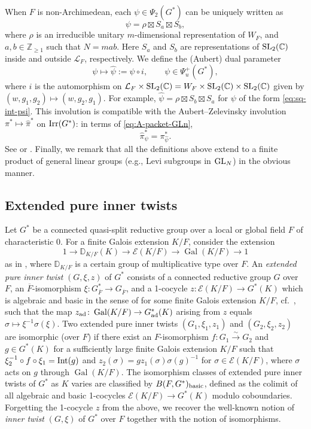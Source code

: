 \documentclass[11pt,reqno]{amsart}
\theoremstyle{plain}
\theoremstyle{definition}
\newcommand{\Z}{\mathbb{Z}}
\newcommand{\D}{\mathbb{D}}
\newcommand{\C}{\mathbb{C}}
\newcommand{\cE}{\mathcal{E}}
\renewcommand{\cL}{\mathcal{L}}
\newcommand{\Gal}{\operatorname{Gal}}
\newcommand{\SL}{\tu{SL}}
\newcommand{\GL}{\tu{GL}}
\newcommand{\ad}{\tu{ad}}
\newcommand{\Int}{\tu{Int}}
\newcommand{\Irr}{\tu{Irr}}
\newcommand{\tu}{\textup}
\newcommand{\ol}{\overline}
\newcommand{\ra}{\rightarrow}
\newcommand{\isom}{\stackrel{\sim}{\ra}}
\renewcommand{\hat}{\widehat}
\numberwithin{equation}{subsection}
\begin{document}
When $F$ is non-Archimedean, each $\psi\in \Psi_2(G^*)$ can be uniquely written as
\begin{equation}\label{eq:sq-int-psi}
  \psi=\rho\boxtimes S_a\boxtimes S_b,
\end{equation}
where 
$\rho$ is an irreducible unitary $m$-dimensional representation of $W_F$, 
and $a,b \in \Z_{\ge 1}$ such that $N=mab$.
Here $S_a$ and $S_b$ are representations of $\SL_2(\C)$ inside and outside $\cL_F$, respectively.
We define the (Aubert) dual parameter
\[
\psi\mapsto \hat \psi:=\psi\circ i, \qquad \psi\in \Psi^+_u(G^*),
\]
where $i$ is the automorphism on $\cL_F\times \SL_2(\C)=W_F\times \SL_2(\C)\times \SL_2(\C)$ given by $(w,g_1,g_2)\mapsto (w,g_2,g_1)$. For example, $\hat \psi=\rho\boxtimes S_b\boxtimes S_a$ for $\psi$ of the form \eqref{eq:sq-int-psi}. This involution is compatible with the Aubert--Zelevinsky involution $\pi^*\mapsto \hat \pi^*$ on $\Irr(G^*)$: 
in terms of \eqref{eq:A-packet-GLn}, 
\begin{equation}\label{eq:Apacket-vs-Aubert}
    \hat \pi^*_{\psi} =  \pi^*_{\hat\psi}.
\end{equation}
See \cite{MW86} or \cite{LM14}.
Finally, we remark that all the definitions above extend to a finite product of general linear groups (e.g., Levi subgroups in $\GL_N$) in the obvious manner.

\subsection{Extended pure inner twists}\label{ss:epit}

Let $G^*$ be a connected quasi-split reductive group over a local or global field $F$ of characteristic $0$. 
For a finite Galois extension $K/F$, consider the extension 
\[
1\to \D_{K/F}(K)\to \cE(K/F)\to \Gal(K/F)\to 1
\]
as in \cite[\S2]{Kot14}, where $\D_{K/F}$ is a certain group of multiplicative type over $F$. 
An \emph{extended pure inner twist} $(G,\xi,z)$ of $G^*$ consists of a connected reductive group $G$ over $F$, an $\ol F$-isomorphism $\xi\colon G^*_{\ol F}\to G_{\ol F}$, and a 1-cocycle $z\colon \cE(K/F)\to G^*(K)$ which is algebraic and basic in the sense of \cite{Kot14} for some finite Galois extension $K/F$, cf.~\cite[\S0.3.1]{KMSW}, such that the map $z_{\ad}\colon \Gal(K/F)\to G^*_{\ad}(K)$ arising from $z$ equals $\sigma\mapsto \xi^{-1}\sigma(\xi)$. Two extended pure inner twists $(G_1,\xi_1,z_1)$ and $(G_2,\xi_2,z_2)$ are isomorphic (over $F$) if there exist an $F$-isomorphism $f\colon G_1\isom G_2$ and $g\in G^*(K)$ for a sufficiently large finite Galois extension $K/F$ such that $\xi_2^{-1}\circ f\circ \xi_1=\Int(g)$ and $z_2(\sigma)=g z_1(\sigma) \sigma(g)^{-1}$ for $\sigma\in \cE(K/F)$, where $\sigma$ acts on $g$ through $\Gal(K/F)$. The isomorphism classes of extended pure inner twists of $G^*$ as $K$ varies are classified by $B(F,G^*)_{\tu{basic}}$, defined as the colimit of all algebraic and basic 1-cocycles $\cE(K/F)\to G^*(K)$ modulo coboundaries. Forgetting the 1-cocycle $z$ from the above, we recover the well-known notion of \emph{inner twist} $(G,\xi)$ of $G^*$ over $F$ together with the notion of isomorphisms.
\end{document}
